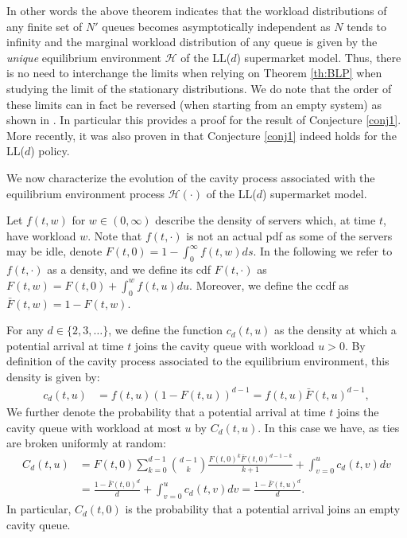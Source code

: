 \documentclass[12pt]{report}
\begin{document}
In other words the above theorem indicates that the workload distributions of any finite set of
$N'$ queues becomes asymptotically independent as $N$ tends to infinity and the marginal workload
distribution of any queue is given by the {\it unique} equilibrium environment $\mathcal{H}$ of the
LL($d$) supermarket model. Thus, there is no need to interchange the limits when relying on 
Theorem \ref{th:BLP} when studying the limit of the stationary distributions. We do note that
the order of these limits can in fact be reversed (when starting from an empty system)
as shown in \cite[Section 8]{bramson2012asymptotic}. In particular this provides a proof for the result of Conjecture \ref{conj1}. More recently, it was also proven in \cite{shneer2020large} that Conjecture \ref{conj1} indeed holds for the LL($d$) policy.

We now characterize the evolution of the cavity process associated with the
equilibrium environment process $\mathcal{H}(\cdot)$ of the LL($d$) supermarket model.

Let $f(t,w)$ for $w \in (0,\infty)$ describe the density of servers which, at time $t$, have workload $w$. Note that $f(t,\cdot)$ is not an actual pdf as some of the servers may be idle, denote $F(t,0) = 1 - \int_{0}^{\infty} f(t,w) ds$. In the following we refer to $f(t,\cdot)$ as a density, and we define its cdf $F(t,\cdot)$ as $F(t,w) = F(t,0) + \int_{0}^w f(t,u) du$. Moreover, we define the ccdf as $\bar F(t,w) = 1-F(t,w)$.

For any $d \in \{2,3,\dots\}$, we define the function $c_d(t,u)$ as the density at which a potential arrival at time $t$ joins the cavity
queue with workload $u > 0$.  By definition of the cavity process
associated to the equilibrium environment, this density is given by:
\begin{align}\label{eq:C}
c_d(t,u) &= f(t,u)(1-F(t,u))^{d-1} = f(t,u)\bar{F}(t,u)^{d-1},
\end{align}
We further denote the probability that a potential arrival at time $t$ joins the cavity queue with workload at most $u$ by $C_d(t,u)$. 
In this case we have, as ties are broken uniformly at random:
\begin{align}\label{eq:barC}
C_d(t,u) &= F(t,0) \sum_{k=0}^{d-1} \binom{d-1}{k }\frac{F(t,0)^k \bar{F}(t,0)^{d-1-k}}{k+1} 
+ \int_{v=0}^u  c_d(t,v) dv 
\nonumber \\
&= \frac{1 - \bar{F}(t,0)^d}{d} + \int_{v=0}^u  c_d(t,v) dv  = \frac{1 - \bar{F}(t,u)^d}{d}.
\end{align}
In particular, $C_d(t,0)$ is the probability that a potential arrival joins an empty cavity queue.
\end{document}
